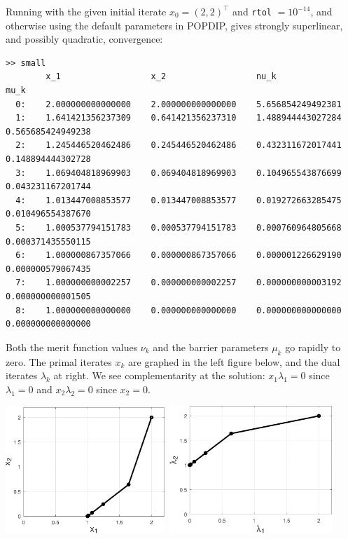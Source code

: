 \documentclass[11pt]{article}
\begin{document}
Running with the given initial iterate $x_0=(2,2)^\top$ and \texttt{rtol} $=10^{-14}$, and otherwise using the default parameters in POPDIP, gives strongly superlinear, and possibly quadratic, convergence:
\begin{Verbatim}[fontsize=\footnotesize]
>> small
        x_1                  x_2                  nu_k                 mu_k
  0:    2.000000000000000    2.000000000000000    5.656854249492381
  1:    1.641421356237309    0.641421356237310    1.488944443027284    0.565685424949238
  2:    1.245446520462486    0.245446520462486    0.432311672017441    0.148894444302728
  3:    1.069404818969903    0.069404818969903    0.104965543876699    0.043231167201744
  4:    1.013447008853577    0.013447008853577    0.019272663285475    0.010496554387670
  5:    1.000537794151783    0.000537794151783    0.000760964805668    0.000371435550115
  6:    1.000000867357066    0.000000867357066    0.000001226629190    0.000000579067435
  7:    1.000000000002257    0.000000000002257    0.000000000003192    0.000000000001505
  8:    1.000000000000000    0.000000000000000    0.000000000000000    0.000000000000000
\end{Verbatim}
Both the merit function values $\nu_k$ and the barrier parameters $\mu_k$ go rapidly to zero.  The primal iterates $x_k$ are graphed in the left figure below, and the dual iterates $\lambda_k$ at right.  We see complementarity at the solution: $x_1 \lambda_1 = 0$ since $\lambda_1=0$ and $x_2\lambda_2=0$ since $x_2=0$.

\bigskip
\mbox{\includegraphics[width=0.45\textwidth]{figs/small.pdf} \qquad \includegraphics[width=0.46\textwidth]{figs/smalldual.pdf}}
\end{document}
